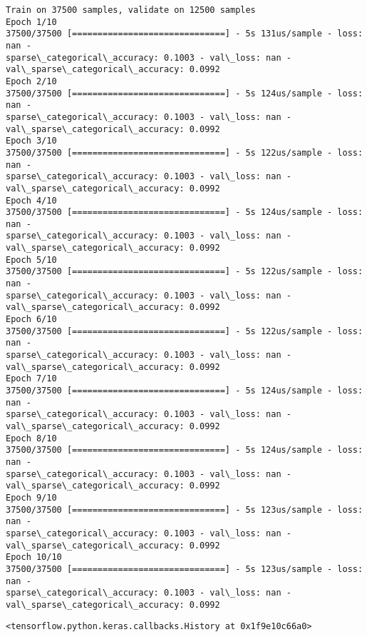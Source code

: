 \documentclass[11pt]{article}
\makeatletter
\newcommand{\boxspacing}{\kern\kvtcb@left@rule\kern\kvtcb@boxsep}
\newcommand{\prompt}[4]{
        \ttfamily\llap{{\color{#2}[#3]:\hspace{3pt}#4}}\vspace{-\baselineskip}
    }
\makeatother
\begin{document}
    \begin{Verbatim}[commandchars=\\\{\}]
Train on 37500 samples, validate on 12500 samples
Epoch 1/10
37500/37500 [==============================] - 5s 131us/sample - loss: nan -
sparse\_categorical\_accuracy: 0.1003 - val\_loss: nan -
val\_sparse\_categorical\_accuracy: 0.0992
Epoch 2/10
37500/37500 [==============================] - 5s 124us/sample - loss: nan -
sparse\_categorical\_accuracy: 0.1003 - val\_loss: nan -
val\_sparse\_categorical\_accuracy: 0.0992
Epoch 3/10
37500/37500 [==============================] - 5s 122us/sample - loss: nan -
sparse\_categorical\_accuracy: 0.1003 - val\_loss: nan -
val\_sparse\_categorical\_accuracy: 0.0992
Epoch 4/10
37500/37500 [==============================] - 5s 124us/sample - loss: nan -
sparse\_categorical\_accuracy: 0.1003 - val\_loss: nan -
val\_sparse\_categorical\_accuracy: 0.0992
Epoch 5/10
37500/37500 [==============================] - 5s 122us/sample - loss: nan -
sparse\_categorical\_accuracy: 0.1003 - val\_loss: nan -
val\_sparse\_categorical\_accuracy: 0.0992
Epoch 6/10
37500/37500 [==============================] - 5s 122us/sample - loss: nan -
sparse\_categorical\_accuracy: 0.1003 - val\_loss: nan -
val\_sparse\_categorical\_accuracy: 0.0992
Epoch 7/10
37500/37500 [==============================] - 5s 124us/sample - loss: nan -
sparse\_categorical\_accuracy: 0.1003 - val\_loss: nan -
val\_sparse\_categorical\_accuracy: 0.0992
Epoch 8/10
37500/37500 [==============================] - 5s 124us/sample - loss: nan -
sparse\_categorical\_accuracy: 0.1003 - val\_loss: nan -
val\_sparse\_categorical\_accuracy: 0.0992
Epoch 9/10
37500/37500 [==============================] - 5s 123us/sample - loss: nan -
sparse\_categorical\_accuracy: 0.1003 - val\_loss: nan -
val\_sparse\_categorical\_accuracy: 0.0992
Epoch 10/10
37500/37500 [==============================] - 5s 123us/sample - loss: nan -
sparse\_categorical\_accuracy: 0.1003 - val\_loss: nan -
val\_sparse\_categorical\_accuracy: 0.0992
    \end{Verbatim}

            \begin{tcolorbox}[breakable, size=fbox, boxrule=.5pt, pad at break*=1mm, opacityfill=0]
\prompt{Out}{outcolor}{23}{\boxspacing}
\begin{Verbatim}[commandchars=\\\{\}]
<tensorflow.python.keras.callbacks.History at 0x1f9e10c66a0>
\end{Verbatim}
\end{tcolorbox}
        
\end{document}
